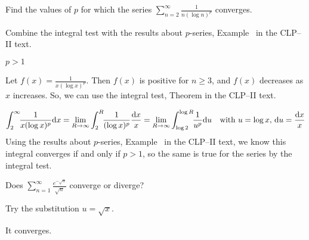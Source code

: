 \begin{question}[2014A]
Find the values of $p$ for which the series
$\displaystyle{\sum_{n=2}^\infty \frac{1}{n(\log n)^p}}$ converges.
\end{question}

\begin{hint}
Combine the integral test with the results about $p$-series, Example~
 in the CLP--II text.
\end{hint}

\begin{answer}
$p>1$
\end{answer}

\begin{solution}
Let $f(x)=\frac{1}{x(\log x)^p}$. Then $f(x)$ is positive for $n \ge 3$, and $f(x)$ decreases as $x$ increases. So, we can use the integral test,
Theorem  in the CLP--II text.

\begin{align*}
\int_2^\infty\!\! \frac{1}{x(\log x)^p} \mathrm{d}x
&=\lim_{R\rightarrow\infty}\int_2^R\!\! \frac{1}{(\log x)^p} \frac{\mathrm{d}x}{x}
=\lim_{R\rightarrow\infty}\int_{\log 2}^{\log R}\!\! \frac{1}{u^p} \mathrm{d}u
\quad\text{with $u=\log x$, $\mathrm{d}u=\frac{\mathrm{d}x}{x}$} \\
\end{align*}
Using the results about $p$-series, Example~ in the CLP--II text,
we know this integral converges if and only if $p>1$, so the same is true for the
series by the integral test.
\end{solution}

\begin{Mquestion}[2016A]
Does ${\displaystyle\sum_{n=1}^\infty\frac{e^{-\sqrt{n}}}{\sqrt{n}}}$ converge or diverge?
\end{Mquestion}

\begin{hint}
Try the substitution $u=\sqrt{x}$.
\end{hint}

\begin{answer}
It converges.
\end{answer}

